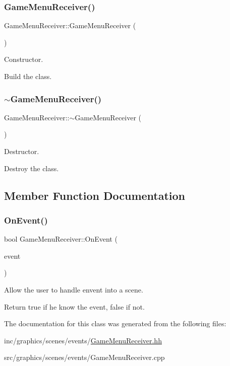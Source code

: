 \subsubsection{\texorpdfstring{Game\+Menu\+Receiver()}{GameMenuReceiver()}}
{\footnotesize\ttfamily Game\+Menu\+Receiver\+::\+Game\+Menu\+Receiver (\begin{DoxyParamCaption}{ }\end{DoxyParamCaption})}



Constructor. 

Build the class. \mbox{\label{classGameMenuReceiver_a490afacab72bebb8b1f28c3977f9ed44}} 
\subsubsection{\texorpdfstring{$\sim$\+Game\+Menu\+Receiver()}{~GameMenuReceiver()}}
{\footnotesize\ttfamily Game\+Menu\+Receiver\+::$\sim$\+Game\+Menu\+Receiver (\begin{DoxyParamCaption}{ }\end{DoxyParamCaption})}



Destructor. 

Destroy the class. 

\subsection{Member Function Documentation}
\mbox{\label{classGameMenuReceiver_af6774556abc7e3718b7bf904cc62ead0}} 
\subsubsection{\texorpdfstring{On\+Event()}{OnEvent()}}
{\footnotesize\ttfamily bool Game\+Menu\+Receiver\+::\+On\+Event (\begin{DoxyParamCaption}\item[{const irr\+::\+S\+Event \&}]{event }\end{DoxyParamCaption})}



Allow the user to handle envent into a scene. 

Return true if he know the event, false if not. 

The documentation for this class was generated from the following files\+:\begin{DoxyCompactItemize}
\item 
inc/graphics/scenes/events/\hyperlink{GameMenuReceiver_8hh}{Game\+Menu\+Receiver.\+hh}\item 
src/graphics/scenes/events/Game\+Menu\+Receiver.\+cpp\end{DoxyCompactItemize}
